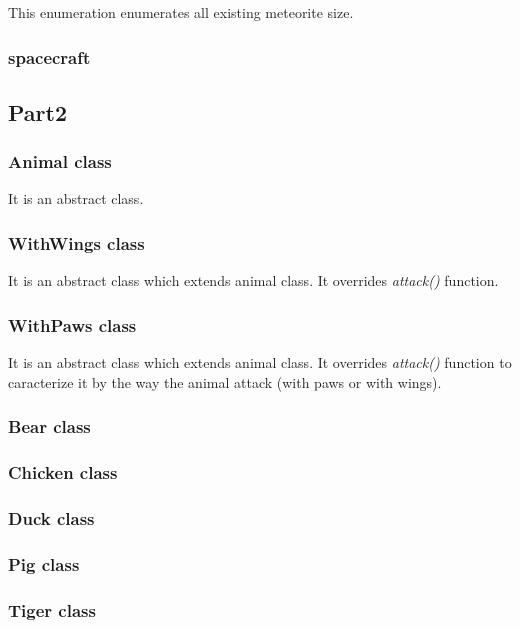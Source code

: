 This enumeration enumerates all existing meteorite size.

\subsubsection{spacecraft}


\subsection{Part2}

\subsubsection{Animal class}

It is an abstract class.

\subsubsection{WithWings class}

It is an abstract class which extends animal class.
It overrides \textit{attack()} function.

\subsubsection{WithPaws class}

It is an abstract class which extends animal class.
It overrides \textit{attack()} function to caracterize it by the way the animal attack (with paws or with wings).

\subsubsection{Bear class}
\subsubsection{Chicken class}
\subsubsection{Duck class}
\subsubsection{Pig class}
\subsubsection{Tiger class}

